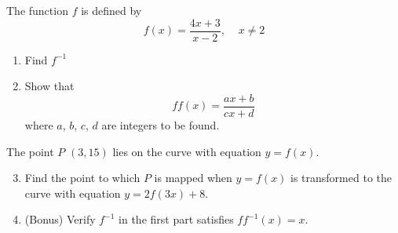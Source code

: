 \begin{exercise}
    The function $f$ is defined by 
    \[f(x) = \frac{4x + 3}{x-2}, \;\;\;\;x \neq 2\]
\begin{enumerate}
    \item Find $f^{-1}$
    \item Show that 
    \[ff(x) = \frac{ax + b}{cx + d}\]
    where $a$, $b$, $c$, $d$ are integers to be found.
\end{enumerate}

The point $P$ $(3,15)$ lies on the curve with equation $y = f(x)$.
\begin{enumerate}
\setcounter{enumi}{2}
    \item Find the point to which $P$ is mapped when $y = f(x)$ is transformed to the curve with equation $y = 2f(3x)+8$.
    \item (Bonus) Verify $f^{-1}$ in the first part satisfies $ff^{-1}(x) = x$.
\end{enumerate}
\end{exercise}
